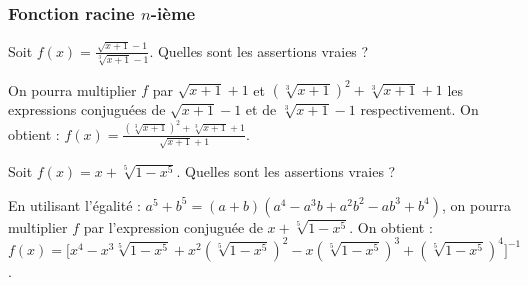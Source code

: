 \subsubsection{Fonction racine $n$-ième}


\begin{question} 
Soit $f(x)= \frac{\sqrt{x+1}-1}{\sqrt[3]{x+1}-1}$. Quelles sont les assertions vraies ?
\begin{answers}

    
    
    
    

\end{answers}
\begin{explanations}
On pourra multiplier $f$ par  $\sqrt{x+1}+1$ et $(\sqrt[3]{x+1})^2+\sqrt[3]{x+1}+1$ les expressions conjuguées de $\sqrt{x+1}-1$ et de $\sqrt[3]{x+1}-1$ respectivement. On obtient : 
$f(x)=\frac{(\sqrt[3]{x+1})^2+\sqrt[3]{x+1}+1}{\sqrt{x+1}+1}$.
\end{explanations}

\end{question}


\begin{question} 
Soit  $f(x)=x+\sqrt[5]{1-x^5}$. Quelles sont les assertions vraies ?
\begin{answers}

    
    
    
\end{answers}
\begin{explanations}
En utilisant l'égalité : $a^5+b^5=(a+b)(a^4-a^3b+a^2b^2-ab^3+b^4)$, on pourra multiplier $f$ par l'expression conjuguée de $x+\sqrt[5]{1-x^5}$. On obtient :
 $f(x)=\big[x^4-x^3\sqrt[5]{1-x^5} +x^2(\sqrt[5]{1-x^5})^2-x(\sqrt[5]{1-x^5})^3+(\sqrt[5]{1-x^5})^4\big]^{-1}$.
\end{explanations}

\end{question}


